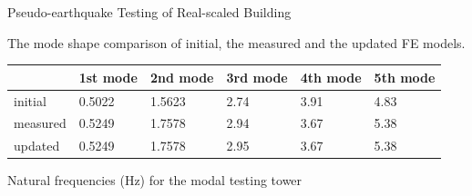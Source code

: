 \documentclass[usepdftitle=false]{beamer}
\begin{document}
\begin{frame}{Pseudo-earthquake Testing of Real-scaled Building}
\begin{figure}[!ht]
\centering
\setcounter{subfigure}{0}
\label{fig:7-6}
\end{figure}
The mode shape comparison of initial, the measured and the updated FE models.

\begin{table}[ht]
\centering
\begin{tabularx}{\textwidth}{@{}X|X|X|X|X|X@{}}
\toprule[1pt]\midrule[0.3pt]
& 1st mode & 2nd mode & 3rd mode & 4th mode & 5th mode\\ \midrule[0.3pt]
initial & 0.5022 & 1.5623 & 2.74 & 3.91 & 4.83\\
measured& 0.5249 & 1.7578 & 2.94 & 3.67 & 5.38\\
updated & 0.5249 & 1.7578 & 2.95 & 3.67 & 5.38\\
\bottomrule
\end{tabularx}
\label{tab:7-3}
\end{table}
Natural frequencies (Hz) for the modal testing tower
\end{frame}
\end{document}
